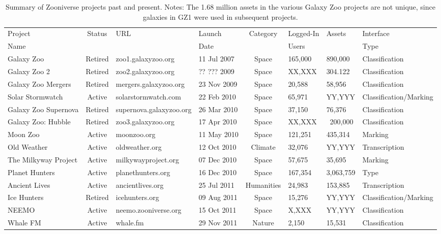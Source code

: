 \documentclass{sigchi}
\begin{document}
\begin{table*}
\begin{center}
\caption{Summary of Zooniverse projects past and present.
Notes: The 1.68 million assets in the various Galaxy Zoo projects are not unique, since galaxies in GZ1 were used in subsequent projects.}
\begin{tabular}{lcllclll}
\hline
Project & Status & URL & Launch & Category & Logged-In & Assets & Interface \\
Name &  &  & Date &  & Users &  &  Type \\
\hline
\hline
Galaxy Zoo & Retired & zoo1.galaxyzoo.org & 11 Jul 2007 & Space & 165,000 & 890,000 & Classification \\
\hline
Galaxy Zoo 2 & Retired & zoo2.galaxyzoo.org & ?? ??? 2009 & Space & XX,XXX & 304.122 & Classification \\
Galaxy Zoo Mergers & Retired & mergers.galaxyzoo.org & 23 Nov 2009 & Space & 20,588 & 58,956 & Classification \\
\hline
Solar Stormwatch & Active & solarstormwatch.com & 22 Feb 2010 & Space & 65,971 & YY,YYY & Classification/Marking \\
Galaxy Zoo Supernova & Retired & supernova.galaxyzoo.org & 26 Mar 2010 & Space & 37,150 & 76,376 & Classification \\
Galaxy Zoo: Hubble & Retired & zoo3.galaxyzoo.org & 17 Apr 2010 & Space & XX,XXX & ~200,000 & Classification \\
Moon Zoo & Active & moonzoo.org & 11 May 2010 & Space & 121,251 & 435,314 & Marking \\
Old Weather & Active & oldweather.org & 12 Oct 2010 & Climate & 32,076 & YY,YYY & Transcription \\
The Milkyway Project & Active & milkywayproject.org & 07 Dec 2010 & Space & 57,675 & 35,695 & Marking \\
Planet Hunters & Active & planethunters.org & 16 Dec 2010 & Space & 167,354 & 3,063,759 & Type \\
\hline
Ancient Lives & Active & ancientlives.org & 25 Jul 2011 & Humanities & 24,983 & 153,885 & Transcription \\
Ice Hunters & Retired & icehunters.org & 09 Aug 2011 & Space & 15,276 & YY,YYY & Classification/Marking \\
NEEMO & Active & neemo.zooniverse.org & 15 Oct 2011 & Space & X,XXX & YY,YYY & Classification \\
Whale FM & Active & whale.fm & 29 Nov 2011 & Nature & 2,150 & 15,531 & Classification \\

\end{tabular}
\end{center}
\end{table*}
\end{document}
